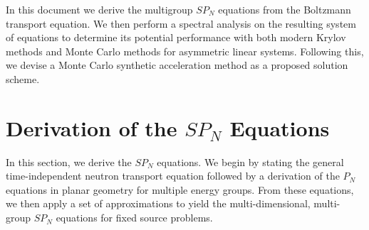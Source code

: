 \documentclass[letterpaper,12pt]{article}
\begin{document}
In this document we derive the multigroup $SP_N$ equations from the
Boltzmann transport equation. We then perform a spectral analysis on
the resulting system of equations to determine its potential
performance with both modern Krylov methods and Monte Carlo methods
for asymmetric linear systems. Following this, we devise a Monte Carlo
synthetic acceleration method as a proposed solution scheme.

\section{Derivation of the $SP_N$ Equations}
\label{sec:derivation}
In this section, we derive the $SP_N$ equations. We begin by stating
the general time-independent neutron transport equation followed by a
derivation of the $P_N$ equations in planar geometry for multiple
energy groups. From these equations, we then apply a set of
approximations to yield the multi-dimensional, multi-group $SP_N$
equations for fixed source problems.
\end{document}
